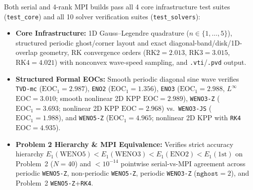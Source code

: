 \documentclass[11pt,a4paper]{article}
\theoremstyle{definition}
\newcommand{\code}[1]{\texttt{#1}}
\begin{document}
Both serial and 4-rank MPI builds pass all 4 core infrastructure test suites (\code{test\_core}) and all 10 solver verification suites (\code{test\_solvers}):
\begin{itemize}
\item \textbf{Core Infrastructure:} 1D Gauss--Legendre quadrature ($n\in\{1,\dots,5\}$), structured periodic ghost/corner layout and exact diagonal-band/disk/1D-overlap geometry, RK convergence orders ($\mathrm{RK2}=2.013$, $\mathrm{RK3}=3.015$, $\mathrm{RK4}=4.021$) with nonconvex wave-speed sampling, and \code{.vti}/\code{.pvd} output.
\item \textbf{Structured Formal EOCs:} Smooth periodic diagonal sine wave verifies \code{TVD-mc} ($\mathrm{EOC}_1 = 2.987$), \code{ENO2} ($\mathrm{EOC}_1 = 1.356$), \code{ENO3} ($\mathrm{EOC}_1 = 2.988$, $L^\infty$ $\mathrm{EOC} = 3.010$; smooth nonlinear 2D KPP $\mathrm{EOC} = 2.989$), \code{WENO3-Z} ($\mathrm{EOC}_1 = 3.693$; nonlinear 2D KPP $\mathrm{EOC} = 2.968$) vs.\ \code{WENO3-JS} ($\mathrm{EOC}_1 = 1.988$), and \code{WENO5-Z} ($\mathrm{EOC}_1 = 4.965$; nonlinear 2D KPP with \code{RK4} $\mathrm{EOC} = 4.935$).
\item \textbf{Problem 2 Hierarchy \& MPI Equivalence:} Verifies strict accuracy hierarchy $E_1(\text{WENO5}) < E_1(\text{WENO3}) < E_1(\text{ENO2}) < E_1(\text{1st})$ on Problem~2 ($N=40$) and $<10^{-14}$ pointwise serial-vs-MPI agreement across periodic \code{WENO5-Z}, non-periodic \code{WENO5-Z}, periodic \code{WENO3-Z} ($\code{nghost}=2$), and Problem~2 \code{WENO5-Z}+\code{RK4}.
\end{itemize}
\end{document}

